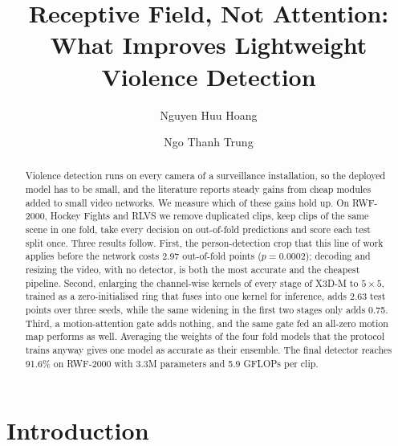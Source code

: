 \documentclass[runningheads]{llncs}
\begin{document}
\title{Receptive Field, Not Attention: What Improves Lightweight Violence Detection}

\author{Nguyen Huu Hoang \and Ngo Thanh Trung}

\maketitle

\begin{abstract}
Violence detection runs on every camera of a surveillance installation, so
the deployed model has to be small, and the literature reports steady gains
from cheap modules added to small video networks. We measure which of these
gains hold up. On RWF-2000, Hockey Fights and RLVS we remove duplicated
clips, keep clips of the same scene in one fold, take every decision on
out-of-fold predictions and score each test split once. Three results
follow. First, the person-detection crop that this line of work applies
before the network costs 2.97 out-of-fold points ($p=0.0002$); decoding and
resizing the video, with no detector, is both the most accurate and the
cheapest pipeline. Second, enlarging the channel-wise kernels of every
stage of X3D-M to $5\times5$, trained as a zero-initialised ring that fuses
into one kernel for inference, adds 2.63 test points over three seeds,
while the same widening in the first two stages only adds 0.75. Third, a
motion-attention gate adds nothing, and the same gate fed an all-zero
motion map performs as well. Averaging the weights of the four fold models
that the protocol trains anyway gives one model as accurate as their
ensemble. The final detector reaches 91.6\% on RWF-2000 with 3.3M
parameters and 5.9 GFLOPs per clip.

\end{abstract}

\section{Introduction}
\end{document}

